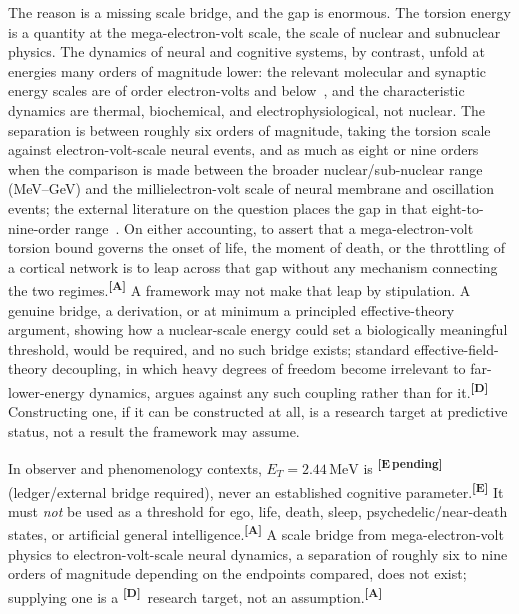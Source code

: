\documentclass[12pt,a4paper,twoside]{article}
\theoremstyle{plain}
\theoremstyle{definition}
\theoremstyle{remark}
\newcommand{\MeV}{\,\mathrm{MeV}}
\newcommand{\catmark}[1]{\textsuperscript{\textsf{\textbf{[#1]}}}}
\newcommand{\ETorsion}{2.44\MeV} %
\begin{document}
The reason is a missing scale bridge, and the gap is enormous. The torsion energy is a quantity at the mega-electron-volt scale, the scale of nuclear and subnuclear physics. The dynamics of neural and cognitive systems, by contrast, unfold at energies many orders of magnitude lower: the relevant molecular and synaptic energy scales are of order electron-volts and below~\cite{attwell2001,harris2012,levy2021}, and the characteristic dynamics are thermal, biochemical, and electrophysiological, not nuclear. The separation is between roughly six orders of magnitude, taking the torsion scale against electron-volt-scale neural events, and as much as eight or nine orders when the comparison is made between the broader nuclear/sub-nuclear range (MeV--GeV) and the millielectron-volt scale of neural membrane and oscillation events; the external literature on the question places the gap in that eight-to-nine-order range~\cite{appelquist1975}. On either accounting, to assert that a mega-electron-volt torsion bound governs the onset of life, the moment of death, or the throttling of a cortical network is to leap across that gap without any mechanism connecting the two regimes.\catmark{A} A framework may not make that leap by stipulation. A genuine bridge, a derivation, or at minimum a principled effective-theory argument, showing how a nuclear-scale energy could set a biologically meaningful threshold, would be required, and no such bridge exists; standard effective-field-theory decoupling, in which heavy degrees of freedom become irrelevant to far-lower-energy dynamics, argues against any such coupling rather than for it.\catmark{D} Constructing one, if it can be constructed at all, is a research target at predictive status, not a result the framework may assume.

\begin{governancebox}
In observer and phenomenology contexts, $E_T = \ETorsion$ is \catmark{E\,pending} (ledger/external bridge required), never an established cognitive parameter.\catmark{E} It must \emph{not} be used as a threshold for ego, life, death, sleep, psychedelic/near-death states, or artificial general intelligence.\catmark{A} A scale bridge from mega-electron-volt physics to electron-volt-scale neural dynamics, a separation of roughly six to nine orders of magnitude depending on the endpoints compared, does not exist; supplying one is a \catmark{D}\ research target, not an assumption.\catmark{A}
\end{governancebox}
\end{document}

